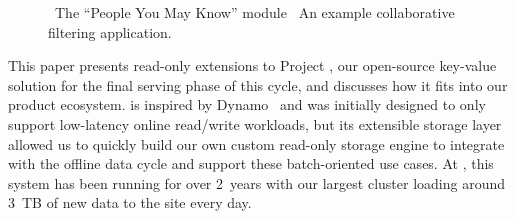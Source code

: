 \begin{figure}
\centering
{}


\caption{~The ``People You May Know'' module
~An example collaborative filtering
application.}
\end{figure}

This paper presents read-only extensions to Project \projectname{},
our open-source key-value solution for the final serving phase of this cycle, and
discusses how it fits into our product ecosystem. \projectname{} is
inspired by Dynamo~\cite{dynamo} and was initially designed to only
support low-latency online read/write workloads, but its extensible storage
layer allowed us to quickly build our own custom read-only storage
engine to integrate with the offline data cycle and support these
batch-oriented use cases. At \linkedin, this system has been running
for over 2~years with our largest cluster loading around 3~TB of new
data to the site every day. 


